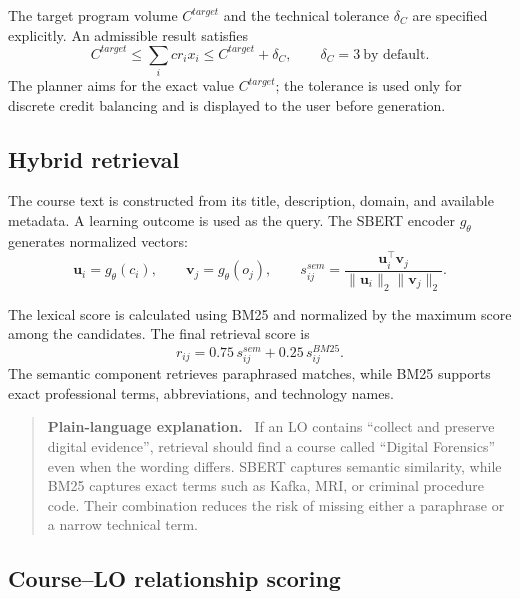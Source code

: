 \documentclass[twoside,11pt]{article}
\newenvironment{plainbox}{\begin{quote}\small\noindent\textbf{Plain-language explanation.}\ }{\end{quote}}
\begin{document}
The target program volume $C^{target}$ and the technical tolerance $\delta_C$ are specified explicitly. An admissible result satisfies
\begin{equation}
  C^{target}\le \sum_i cr_i x_i \le C^{target}+\delta_C,
  \qquad \delta_C=3\ \text{by default}.
  \label{eq:credit-tolerance}
\end{equation}
The planner aims for the exact value $C^{target}$; the tolerance is used only for discrete credit balancing and is displayed to the user before generation.

\subsection{Hybrid retrieval}

The course text is constructed from its title, description, domain, and available metadata. A learning outcome is used as the query. The SBERT encoder $g_\theta$ generates normalized vectors:
\begin{equation}
  \mathbf{u}_i=g_\theta(c_i),\qquad
  \mathbf{v}_j=g_\theta(o_j),\qquad
  s_{ij}^{sem}=
  \frac{\mathbf{u}_i^\top\mathbf{v}_j}
       {\|\mathbf{u}_i\|_2\|\mathbf{v}_j\|_2}.
  \label{eq:cosine}
\end{equation}

The lexical score is calculated using BM25 \cite{Robertson2009} and normalized by the maximum score among the candidates. The final retrieval score is
\begin{equation}
  r_{ij}=0.75\,s_{ij}^{sem}+0.25\,s_{ij}^{BM25}.
  \label{eq:hybrid}
\end{equation}
The semantic component retrieves paraphrased matches, while BM25 supports exact professional terms, abbreviations, and technology names.

\begin{plainbox}
If an LO contains ``collect and preserve digital evidence'', retrieval should find a course called ``Digital Forensics'' even when the wording differs. SBERT captures semantic similarity, while BM25 captures exact terms such as Kafka, MRI, or criminal procedure code. Their combination reduces the risk of missing either a paraphrase or a narrow technical term.
\end{plainbox}

\subsection{Course--LO relationship scoring}
\end{document}
